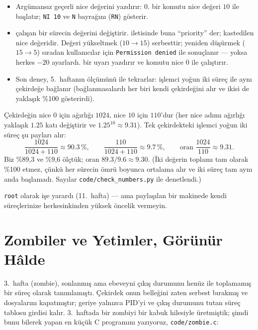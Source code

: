 \begin{itemize}
  \item Argümansız  geçerli nice değerini yazdırır: $0$.  bir komutu nice değeri $10$ ile başlatır;  \texttt{NI 10} ve \texttt{N} bayrağını (\texttt{RN}) gösterir.
  \item {} çalışan bir sürecin değerini değiştirir.  iletisinde buna ``priority'' der; kastedilen nice değeridir. Değeri yükseltmek ($10 \to 15$) serbesttir; yeniden düşürmek ($15 \to 5$) sıradan kullanıcılar için \texttt{Permission denied} ile sonuçlanır --- yoksa herkes $-20$ ayarlardı.  bir uyarı yazdırır ve komutu nice $0$ ile çalıştırır.
  \item Son deney, 5.~haftanın ölçümünü  ile tekrarlar: işlemci yoğun iki süreç  ile aynı çekirdeğe bağlanır (bağlanmasalardı her biri kendi çekirdeğini alır ve ikisi de yaklaşık \%100 gösterirdi).
\end{itemize}

\begin{example}
Çekirdeğin nice $0$ için ağırlığı $1024$, nice $10$ için $110$'dur (her nice adımı ağırlığı yaklaşık $1.25$ katı değiştirir ve $1.25^{10} \approx 9.31$). Tek çekirdekteki işlemci yoğun iki süreç şu payları alır:
\[
\frac{1024}{1024 + 110} \approx 90.3\,\%, \qquad \frac{110}{1024 + 110} \approx 9.7\,\%, \qquad \text{oran } \frac{1024}{110} \approx 9.31 .
\]
Biz \%89,3 ve \%9,6 ölçtük; oran $89.3 / 9.6 \approx 9.30$. (İki değerin toplamı tam olarak \%100 etmez, çünkü  her sürecin ömrü boyunca ortalama alır ve iki süreç tam aynı anda başlamadı. Sayılar \texttt{code/check\_numbers.py} ile denetlendi.)
\end{example}

\texttt{root} olarak  işe yarardı (11.~hafta) --- ama paylaşılan bir makinede kendi süreçlerinize herkesinkinden yüksek öncelik vermeyin.

\section{Zombiler ve Yetimler, Görünür Hâlde}
\label{sec:zombie}

3.~hafta  (zombie), sonlanmış ama ebeveyni çıkış durumunu henüz  ile toplamamış bir süreç olarak tanımlamıştı. Çekirdek onun belleğini zaten serbest bırakmış ve dosyalarını kapatmıştır; geriye yalnızca PID'yi ve çıkış durumunu tutan süreç tablosu girdisi kalır. 3.~haftada bir zombiyi bir kabuk hilesiyle üretmiştik; şimdi bunu bilerek yapan en küçük C programını yazıyoruz, \texttt{code/zombie.c}:

